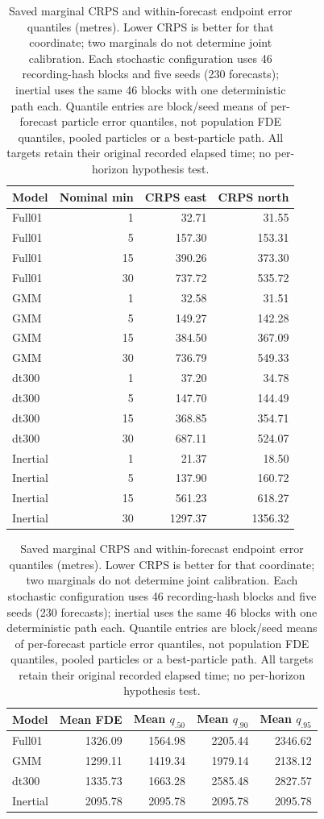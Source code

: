 \begin{table}[htbp]
\centering\small
\caption{Saved marginal CRPS and within-forecast endpoint error quantiles (metres). Lower CRPS is better for that coordinate; two marginals do not determine joint calibration. Each stochastic configuration uses 46 recording-hash blocks and five seeds (230 forecasts); inertial uses the same 46 blocks with one deterministic path each. Quantile entries are block/seed means of per-forecast particle error quantiles, not population FDE quantiles, pooled particles or a best-particle path. All targets retain their original recorded elapsed time; no per-horizon hypothesis test.}
\label{tab:crps-endpoint-diagnostics}
\begin{tabular}{@{}lrrr@{}}
\toprule
Model & Nominal min & CRPS east & CRPS north\\
\midrule
Full01 & 1 & 32.71 & 31.55\\
Full01 & 5 & 157.30 & 153.31\\
Full01 & 15 & 390.26 & 373.30\\
Full01 & 30 & 737.72 & 535.72\\
GMM & 1 & 32.58 & 31.51\\
GMM & 5 & 149.27 & 142.28\\
GMM & 15 & 384.50 & 367.09\\
GMM & 30 & 736.79 & 549.33\\
dt300 & 1 & 37.20 & 34.78\\
dt300 & 5 & 147.70 & 144.49\\
dt300 & 15 & 368.85 & 354.71\\
dt300 & 30 & 687.11 & 524.07\\
Inertial & 1 & 21.37 & 18.50\\
Inertial & 5 & 137.90 & 160.72\\
Inertial & 15 & 561.23 & 618.27\\
Inertial & 30 & 1297.37 & 1356.32\\
\bottomrule
\end{tabular}
\par\medskip
\begin{tabular}{@{}lrrrr@{}}
\toprule
Model & Mean FDE & Mean $q_{.50}$ & Mean $q_{.90}$ & Mean $q_{.95}$\\
\midrule
Full01 & 1326.09 & 1564.98 & 2205.44 & 2346.62\\
GMM & 1299.11 & 1419.34 & 1979.14 & 2138.12\\
dt300 & 1335.73 & 1663.28 & 2585.48 & 2827.57\\
Inertial & 2095.78 & 2095.78 & 2095.78 & 2095.78\\
\bottomrule
\end{tabular}
\end{table}
